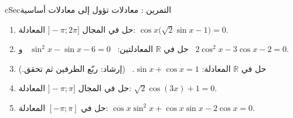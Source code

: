 \documentclass[12pt,a4paper]{article}
\newenvironment{BOX}[2]{\begin{otherlanguage}{english}\begin{arbox}{#1}{#2}}{\end{arbox}\end{otherlanguage}}
\newcounter{exo}
\newenvironment{tamrin}[1]{\stepcounter{exo}\begin{BOX}{cSec}{التمرين \theexo: #1}}{\end{BOX}}
\newcommand{\R}{\mathbb{R}}
\begin{document}
\begin{tamrin}{معادلات تؤول إلى معادلات أساسية}
\begin{enumerate}
\item حل في المجال $]-\pi;2\pi]$ المعادلة: $\cos x\big(\sqrt2\sin x-1\big)=0$.
\item حل في $\R$ المعادلتين: \ $\sin^2x-\sin x-6=0$ \ و \ $2\cos^2x-3\cos x-2=0$.
\item حل في $\R$ المعادلة: $\sin x+\cos x=1$. \ (إرشاد: ربّع الطرفين ثم تحقق.)
\item حل في المجال $]-\pi;\pi]$ المعادلة: $\sqrt2\cos(3x)+1=0$.
\item حل في $[-\pi;\pi]$ المعادلة: $\cos x\sin^2x+\cos x\sin x-2\cos x=0$.
\end{enumerate}
\end{tamrin}
\end{document}
